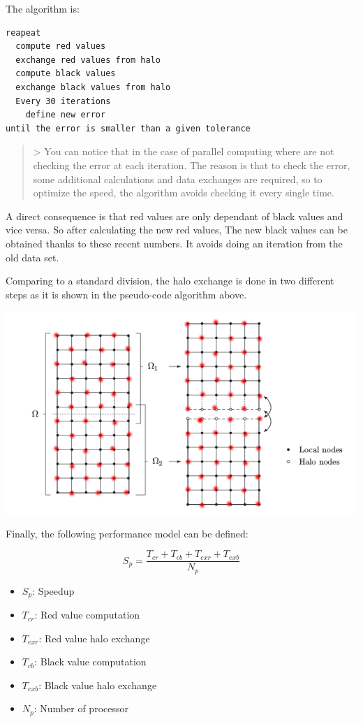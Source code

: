 \documentclass[a4paper,11pt]{article}
\begin{document}
The algorithm is:

\begin{verbatim}
reapeat 
  compute red values
  exchange red values from halo
  compute black values
  exchange black values from halo
  Every 30 iterations
    define new error
until the error is smaller than a given tolerance
\end{verbatim}

\begin{quote}
> You can notice that in the case of parallel computing where are not checking the error at each
iteration. The reason is that to check the error, some additional calculations and
data exchanges are required, so to optimize the speed, the algorithm avoids checking it every single time.
\end{quote}

A direct consequence is that red values are only dependant of black values and vice versa. So after
calculating the new red values, The new black values can be obtained thanks to these recent numbers.
It avoids doing an iteration from the old data set.

Comparing to a standard division, the halo exchange is done in two different steps as it is shown in the
pseudo-code algorithm above.

\includegraphics[width=\textwidth]{images/redblack.png}


Finally, the following performance model can be defined:

\[
S_p = \frac{T_{cr} + T_{cb} + T_{exr} + T_{exb}}{N_p}
\]

\begin{itemize}
  \item{$S_p$: Speedup}
  \item{$T_{cr}$: Red value computation}
  \item{$T_{exr}$: Red value halo exchange}
  \item{$T_{cb}$: Black value computation}
  \item{$T_{exb}$: Black value halo exchange}
  \item{$N_p$: Number of processor}
\end{itemize}
\end{document}
